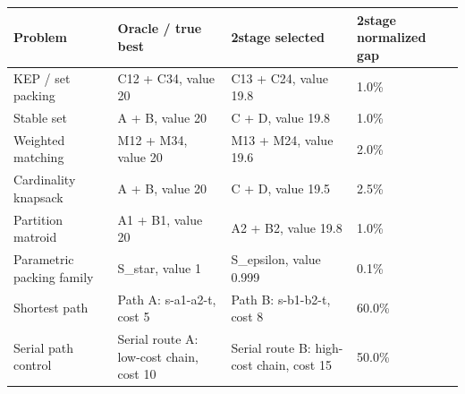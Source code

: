 \begin{tabular}{llll}
\toprule
Problem & Oracle / true best & 2stage selected & 2stage normalized gap \\
\midrule
KEP / set packing & C12 + C34, value 20 & C13 + C24, value 19.8 & 1.0\% \\
Stable set & A + B, value 20 & C + D, value 19.8 & 1.0\% \\
Weighted matching & M12 + M34, value 20 & M13 + M24, value 19.6 & 2.0\% \\
Cardinality knapsack & A + B, value 20 & C + D, value 19.5 & 2.5\% \\
Partition matroid & A1 + B1, value 20 & A2 + B2, value 19.8 & 1.0\% \\
Parametric packing family & S\_star, value 1 & S\_epsilon, value 0.999 & 0.1\% \\
Shortest path & Path A: s-a1-a2-t, cost 5 & Path B: s-b1-b2-t, cost 8 & 60.0\% \\
Serial path control & Serial route A: low-cost chain, cost 10 & Serial route B: high-cost chain, cost 15 & 50.0\% \\
\bottomrule
\end{tabular}

